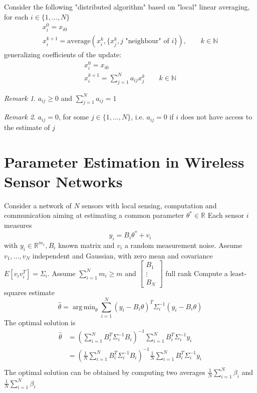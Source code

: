 \documentclass{book}
\DeclareMathOperator*{\argmin}{arg\,min}
\newcommand{\R}{\mathbb{R}}
\newcommand{\N}{\mathbb{N}}
\theoremstyle{theoremv2}
\theoremstyle{defv2}
\theoremstyle{remark}
\newtheorem*{remark}{Remark}
\theoremstyle{remark}
\theoremstyle{definition}
\theoremstyle{definition}
\begin{document}
Consider the following "distributed algorithm" based on "local" linear averaging, for each $i\in\{1,\dots,N\}$
\begin{gather*}
    x_i^0=x_{i0}\\
    x_i^{k+1} = \text{average}(x_i^k,\{x_j^k,j\text{ "neighbour" of }i\}), \qquad k\in\N
\end{gather*}
generalizing coefficients of the update: 
\begin{gather*}
    x_i^0=x_{i0}\\
    x_i^{k+1} = \displaystyle\sum_{j=1}^{N} a_{ij}x_j^k \qquad k\in\N
\end{gather*}
\begin{remark}
    $a_{ij}\geq 0$ and $\sum_{j=1}^{N}a_{ij}=1$
\end{remark}
\begin{remark}
    $a_{ij}=0$, for some $j\in\{1,\dots,N\}$, i.e. $a_{ij}=0$ if $i$ does not have access to the estimate of $j$
\end{remark}


\section{Parameter Estimation in Wireless Sensor Networks}

Consider a network of $N$ sensors with local sensing, computation and communication aiming at estimating a common parameter $\theta^*\in\R$
Each sensor $i$ measures 
\[
    y_i=B_i\theta^* + v_i
\]
with $y_i\in\R^{m_1},B_i$ known matrix and $v_i$ a random measurement noise. Assume $v_1,\dots,v_N$ independent and Gaussian, with zero mean and covariance $E[v_iv_i^T]=\Sigma_i$. Assume $\sum_{i=1}^{N}m_i\geq m$ and $\begin{bmatrix}
    B_1 \\ \vdots \\ B_N
\end{bmatrix} $ full rank
Compute a least-squares estimate 
\[
    \hat\theta = \argmin_\theta \displaystyle\sum_{i=1}^{N}(y_i-B_i\theta)^T\Sigma_i^{-1}(y_i-B_i\theta)
\]
The optimal solution is 
\begin{align*}
    \hat\theta &= \left(\displaystyle\sum_{i=1}^{N}B_i^T\Sigma_i^{-1}B_i \right)^{-1} \displaystyle\sum_{i=1}^{N}B_i^T\Sigma_i^{-1}y_i\\ 
    & =  \left(\displaystyle\frac{1}{N}\displaystyle\sum_{i=1}^{N}B_i^T\Sigma_i^{-1}B_i \right)^{-1} \displaystyle\frac{1}{N}\displaystyle\sum_{i=1}^{N}B_i^T\Sigma_i^{-1}y_i\\ 
\end{align*}
The optimal solution can be obtained by computing two averages $\frac{1}{N}\displaystyle\sum_{i=1}^{N}\beta_i$ and $\frac{1}{N}\displaystyle\sum_{i=1}^{N}\beta_i$
\end{document}
